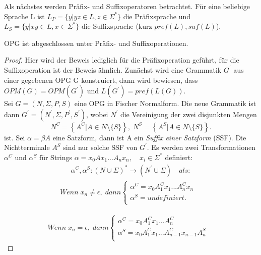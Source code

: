 Als nächstes werden Präfix- und Suffixoperatoren betrachtet. Für eine beliebige Sprache L ist $L_P=\{y|yz \in L, z\in \Sigma^*\}$ die Präfixsprache und $L_S=\{y|xy \in L, x \in \Sigma^*\}$ die Suffixsprache (kurz $pref(L), suf(L)$).
\begin{theorem}
OPG ist abgeschlossen unter Präfix- und Suffixoperationen.
\end{theorem}
\begin{proof}
Hier wird der Beweis lediglich für die Präfixoperation geführt, für die Suffixoperation ist der Beweis ähnlich. Zunächst wird eine Grammatik $G^\prime$ aus einer gegebenen OPG G konstruiert, dann wird bewiesen, dass $OPM(G)=OPM(G^\prime)$ und $L(G^\prime)=pref(L(G))$.\\
Sei $G=(N, \Sigma, P, S)$ eine OPG in Fischer Normalform. Die neue Grammatik ist dann $G^\prime = (N^\prime, \Sigma, P^\prime, S^\prime)$, wobei $N^\prime$ die Vereinigung der zwei disjunkten Mengen
\begin{equation*}
N^C=\left\{A^C|A\in N \setminus \{S\} \right\}, \;
N^S=\left\{A^S|A\in N \setminus \{S\} \right\}.
\end{equation*}
ist. Sei $\alpha = \beta A$ eine Satzform, dann ist A ein \textit{Suffix einer Satzform} (SSF). Die Nichtterminale $A^S$ sind nur solche SSF von $G^\prime$. Es werden zwei Transformationen $\alpha^C$ und $\alpha^S$ für Strings $\alpha=x_0Ax_1...A_nx_n, \quad x_i \in \Sigma^*$ definiert: 
\begin{align*}
\alpha^C, \alpha^S: (N \cup \Sigma)^* \rightarrow (N^\prime \cup \Sigma)\quad als:
\end{align*}
\begin{eqnarray*}
Wenn \; x_n \neq \epsilon, \; dann  
\begin{cases}
\alpha^C  = x_0 A_1^Cx_1...A_n^Cx_n & \\
\alpha^S = undefiniert. & \\
\end{cases}
\end{eqnarray*}

\begin{eqnarray*}
Wenn \; x_n = \epsilon, \;dann 
\begin{cases}
\alpha^C  = x_0 A_1^Cx_1...A_n^C & \\
\alpha^S = x_0 A_1^Cx_1...A_{n-1}^Cx_{n-1}A_n^S  & \\
\end{cases}
\end{eqnarray*}
\end{proof}
